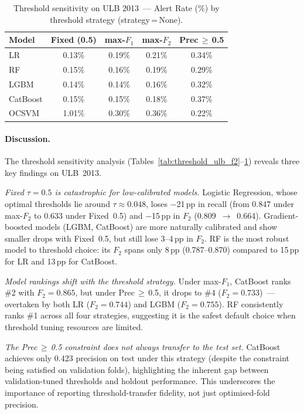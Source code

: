 \begin{table}[ht]
\centering
\caption{Threshold sensitivity on ULB 2013~--- Alert Rate (\%) by threshold strategy (strategy\,=\,None).}
\label{tab:threshold_ulb_alert}
\begin{tabular}{l c c c c}
\toprule
Model & Fixed (0.5) & max-$F_1$ & max-$F_2$ & Prec\,$\geq$\,0.5 \\
\midrule
LR         & 0.13\% & 0.19\% & 0.21\% & 0.34\% \\
RF         & 0.15\% & 0.16\% & 0.19\% & 0.29\% \\
LGBM       & 0.14\% & 0.14\% & 0.16\% & 0.32\% \\
CatBoost   & 0.15\% & 0.15\% & 0.18\% & 0.37\% \\
OCSVM      & 1.01\% & 0.30\% & 0.36\% & 0.22\% \\
\bottomrule
\end{tabular}
\end{table}

\paragraph{Discussion.}
The threshold sensitivity analysis
(Tables~\ref{tab:threshold_ulb_f2}--\ref{tab:threshold_ulb_alert})
reveals three key findings on ULB~2013.

\textit{Fixed $\tau=0.5$ is catastrophic for low-calibrated models.}
Logistic Regression, whose optimal thresholds lie around $\tau\approx0.048$,
loses $-$21\,pp in recall (from 0.847 under max-$F_2$ to 0.633 under Fixed~0.5)
and $-$15\,pp in $F_2$ (0.809~$\to$~0.664).
Gradient-boosted models (LGBM, CatBoost) are more naturally calibrated
and show smaller drops with Fixed~0.5, but still lose 3--4\,pp in $F_2$.
RF is the most robust model to threshold choice:
its $F_2$ spans only 8\,pp (0.787--0.870) compared to 15\,pp for LR and 13\,pp for CatBoost.

\textit{Model rankings shift with the threshold strategy.}
Under max-$F_1$, CatBoost ranks \#2 with $F_2=0.865$,
but under Prec\,$\geq$\,0.5, it drops to \#4 ($F_2=0.733$)~---
overtaken by both LR ($F_2=0.744$) and LGBM ($F_2=0.755$).
RF consistently ranks \#1 across all four strategies,
suggesting it is the safest default choice when threshold tuning resources are limited.

\textit{The Prec\,$\geq$\,0.5 constraint does not always transfer to the test set.}
CatBoost achieves only 0.423 precision on test under this strategy
(despite the constraint being satisfied on validation folds),
highlighting the inherent gap between validation-tuned thresholds and holdout performance.
This underscores the importance of reporting threshold-transfer fidelity,
not just optimised-fold precision.

